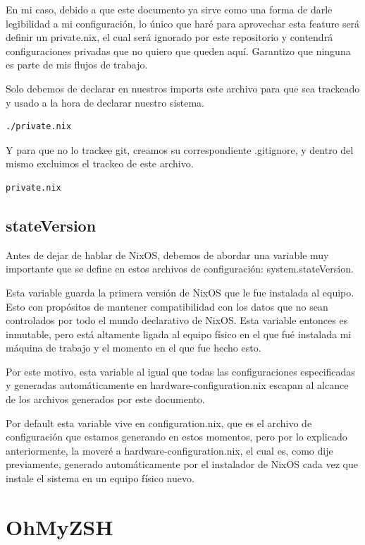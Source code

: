 \documentclass[11pt]{article}
\begin{document}
En mi caso, debido a que este documento ya sirve como una forma de darle legibilidad a mi configuración, lo único que haré para aprovechar esta feature será definir un private.nix, el cual será ignorado por este repositorio y contendrá configuraciones privadas que no quiero que queden aquí. Garantizo que ninguna es parte de mis flujos de trabajo.

Solo debemos de declarar en nuestros imports este archivo para que sea trackeado y usado a la hora de declarar nuestro sistema.

\begin{verbatim}
./private.nix
\end{verbatim}

Y para que no lo trackee git, creamos su correspondiente .gitignore, y dentro del mismo excluimos el trackeo de este archivo.

\begin{verbatim}
private.nix
\end{verbatim}
\subsection{stateVersion}
\label{sec:orgae6c91e}

Antes de dejar de hablar de NixOS, debemos de abordar una variable muy importante que se define en estos archivos de configuración: system.stateVersion.

Esta variable guarda la primera versión de NixOS que le fue instalada al equipo. Esto con propósitos de mantener compatibilidad con los datos que no sean controlados por todo el mundo declarativo de NixOS. Esta variable entonces es inmutable, pero está altamente ligada al equipo físico en el que fué instalada mi máquina de trabajo y el momento en el que fue hecho esto.

Por este motivo, esta variable al igual que todas las configuraciones especificadas y generadas automáticamente en hardware-configuration.nix escapan al alcance de los archivos generados por este documento.

Por default esta variable vive en configuration.nix, que es el archivo de configuración que estamos generando en estos momentos, pero por lo explicado anteriormente, la moveré a hardware-configuration.nix, el cual es, como dije previamente, generado automáticamente por el instalador de NixOS cada vez que instale el sistema en un equipo físico nuevo.
\section{OhMyZSH}
\label{sec:org42cb61e}
\end{document}
